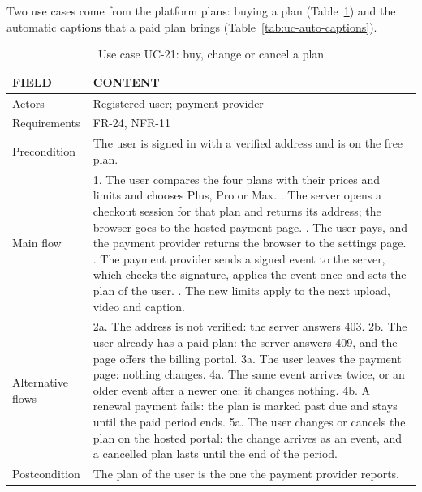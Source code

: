 Two use cases come from the platform plans: buying a plan (Table~\ref{tab:uc-plan}) and
the automatic captions that a paid plan brings (Table~\ref{tab:uc-auto-captions}).

\begin{table}[H]
\centering
\caption{Use case UC-21: buy, change or cancel a plan}
\label{tab:uc-plan}
\small
\begin{tabularx}{\textwidth}{p{} X}
\toprule
\textbf{FIELD} & \textbf{CONTENT} \\
\midrule
Actors & Registered user; payment provider \\
Requirements & FR-24, NFR-11 \\
Precondition & The user is signed in with a verified address and is on the free plan. \\
Main flow &
  1. The user compares the four plans with their prices and limits and chooses Plus, Pro or Max. \newline
  2. The server opens a checkout session for that plan and returns its address; the browser goes to the hosted payment page. \newline
  3. The user pays, and the payment provider returns the browser to the settings page. \newline
  4. The payment provider sends a signed event to the server, which checks the signature, applies the event once and sets the plan of the user. \newline
  5. The new limits apply to the next upload, video and caption. \\
Alternative flows &
  2a. The address is not verified: the server answers 403. \newline
  2b. The user already has a paid plan: the server answers 409, and the page offers the billing portal. \newline
  3a. The user leaves the payment page: nothing changes. \newline
  4a. The same event arrives twice, or an older event after a newer one: it changes nothing. \newline
  4b. A renewal payment fails: the plan is marked past due and stays until the paid period ends. \newline
  5a. The user changes or cancels the plan on the hosted portal: the change arrives as an event, and a cancelled plan lasts until the end of the period. \\
Postcondition & The plan of the user is the one the payment provider reports. \\
\bottomrule
\end{tabularx}
\end{table}

